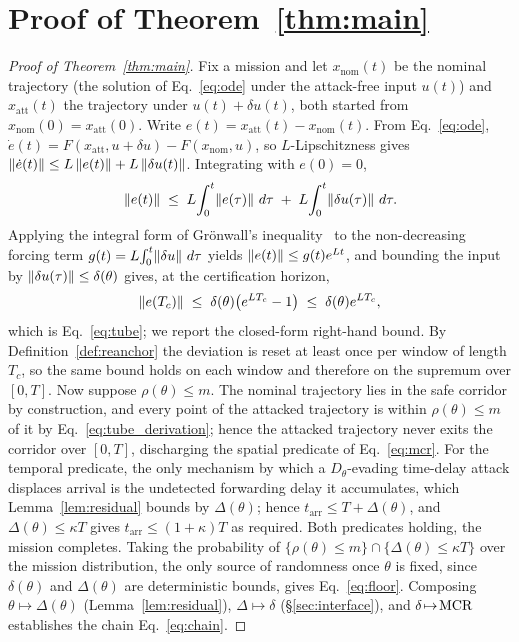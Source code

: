 \section{Proof of Theorem~\ref{thm:main}}
\label{app:proof}
\begin{proof}[Proof of Theorem~\ref{thm:main}]
Fix a mission and let $x_{\mathrm{nom}}(t)$ be the nominal trajectory (the
solution of Eq.~\eqref{eq:ode} under the attack-free input $u(t)$) and
$x_{\mathrm{att}}(t)$ the trajectory under $u(t)+\delta u(t)$, both started from
$x_{\mathrm{nom}}(0)=x_{\mathrm{att}}(0)$. Write
$e(t)=x_{\mathrm{att}}(t)-x_{\mathrm{nom}}(t)$. From Eq.~\eqref{eq:ode},
$\dot e(t)=F(x_{\mathrm{att}},u+\delta u)-F(x_{\mathrm{nom}},u)$, so
$L$-Lipschitzness gives
$\left\lVert \dot e(t)\right\rVert\le L\left\lVert e(t)\right\rVert+L\left\lVert \delta u(t)\right\rVert$. Integrating with
$e(0)=0$,
\[
\left\lVert e(t)\right\rVert\;\le\;L\!\int_0^t\!\left\lVert e(\tau)\right\rVert\,d\tau
\;+\;L\!\int_0^t\!\left\lVert \delta u(\tau)\right\rVert\,d\tau .
\]
Applying the integral form of Gr\"onwall's inequality~\cite{gronwall1919} to the
non-decreasing forcing term $g(t)=L\!\int_0^t\!\left\lVert \delta u\right\rVert\,d\tau$ yields
$\left\lVert e(t)\right\rVert\le g(t)e^{Lt}$, and bounding the input by
$\left\lVert \delta u(\tau)\right\rVert\le\delta(\theta)$ gives, at the certification horizon,
\begin{equation}
\label{eq:tube_derivation}
\left\lVert e(T_c)\right\rVert\;\le\;\delta(\theta)\big(e^{LT_c}-1\big)\;\le\;\delta(\theta)e^{LT_c},
\end{equation}
which is Eq.~\eqref{eq:tube}; we report the closed-form right-hand bound. By
Definition~\ref{def:reanchor} the deviation is reset at least once per window of
length $T_c$, so the same bound holds on each window and therefore on the
supremum over $[0,T]$. Now suppose $\rho(\theta)\le m$. The nominal trajectory
lies in the safe corridor by construction, and every point of the attacked
trajectory is within $\rho(\theta)\le m$ of it by
Eq.~\eqref{eq:tube_derivation}; hence the attacked trajectory never exits the
corridor over $[0,T]$, discharging the spatial predicate of
Eq.~\eqref{eq:mcr}. For the temporal predicate, the only mechanism by
which a $D_\theta$-evading time-delay attack displaces arrival is the undetected
forwarding delay it accumulates, which Lemma~\ref{lem:residual} bounds by
$\Delta(\theta)$; hence $t_{\mathrm{arr}}\le T+\Delta(\theta)$, and
$\Delta(\theta)\le\kappa T$ gives $t_{\mathrm{arr}}\le(1+\kappa)T$ as required.
Both predicates holding, the mission completes. Taking the probability of
$\{\rho(\theta)\le m\}\cap\{\Delta(\theta)\le\kappa T\}$ over the mission
distribution, the only source of randomness once $\theta$ is fixed, since
$\delta(\theta)$ and $\Delta(\theta)$ are deterministic bounds, gives
Eq.~\eqref{eq:floor}. Composing
$\theta\!\mapsto\!\Delta(\theta)$ (Lemma~\ref{lem:residual}),
$\Delta\!\mapsto\!\delta$ (\S\ref{sec:interface}), and $\delta\!\mapsto\!\mathrm{MCR}$
establishes the chain Eq.~\eqref{eq:chain}.
\end{proof}



